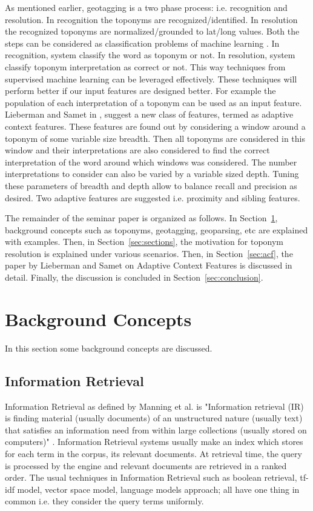 \documentclass[
     11pt,         %
     a4paper,      %
     oneside,
     ]{article}
\begin{document}
As mentioned earlier, geotagging is a two phase process: i.e. recognition and resolution. In recognition the toponyms are recognized/identified. In resolution the recognized toponyms are normalized/grounded to lat/long values. Both the steps can be considered as classification problems of machine learning \cite{Lieberman12adaptivecontext}. In recognition, system classify the word as toponym or not. In resolution, system classify toponym interpretation as correct or not. This way techniques from supervised machine learning can be leveraged effectively. These techniques will perform better if our input features are designed better. For example the population of each interpretation of a toponym can be used as an input feature. Lieberman and Samet in \cite{Lieberman12adaptivecontext}, suggest a new class of features, termed as adaptive context features. These features are found out by considering a window around a toponym of some variable size breadth. Then all toponyms are considered in this window and their interpretations are also considered to find the correct interpretation of the word around which windows was considered. The number interpretations to consider can also be varied by a variable sized depth. Tuning these parameters of breadth and depth allow to balance recall and precision as desired. Two adaptive features are suggested i.e. proximity and sibling features. 

The remainder of the seminar paper is organized as follows. In Section~\ref{sec:background_concepts}, background concepts such as toponyms, geotagging, geoparsing, etc are explained with examples.
Then, in Section~\ref{sec:sections}, the motivation for toponym resolution is explained under various scenarios. Then, in Section~\ref{sec:acf}, the paper by Lieberman and Samet \cite{Lieberman12adaptivecontext} on Adaptive Context Features is discussed in detail. Finally, the discussion is concluded in Section~\ref{sec:conclusion}.

\section{Background Concepts}\label{sec:background_concepts}
In this section some background concepts are discussed.

\subsection{Information Retrieval}
Information Retrieval as defined by Manning et al. is "Information retrieval (IR) is finding material (usually documents) of an unstructured nature (usually text) that satisfies an information need from within large collections (usually stored on computers)" \cite{Manning:2008:IIR:1394399}. Information Retrieval systems usually make an index which stores for each term in the corpus, its relevant documents. At retrieval time, the query is processed by the engine and relevant documents are retrieved in a ranked order. The usual techniques in Information Retrieval such as boolean retrieval, tf-idf model, vector space model, language models approach; all have one thing in common i.e. they consider the query terms uniformly.
\end{document}
